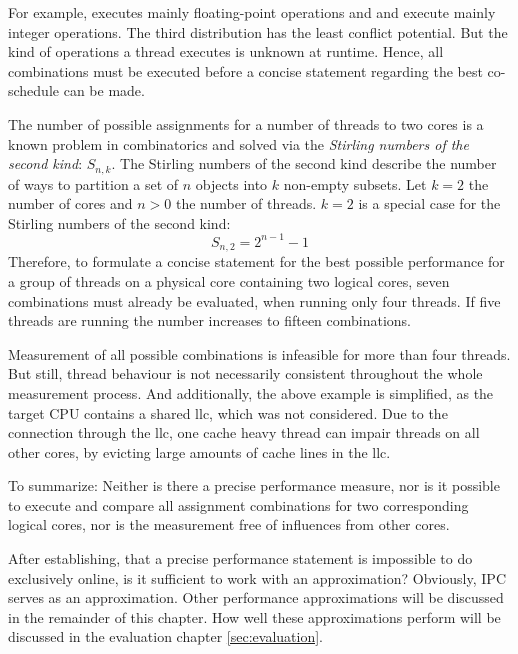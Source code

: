 For example, \gamma{} executes mainly floating-point operations and
\alpha{} and \beta{} execute mainly integer operations.
The third distribution has the least conflict potential.
But the kind of operations a thread executes is unknown at runtime.
Hence, all combinations must be executed before a concise statement regarding
the best co-schedule can be made.

The number of possible assignments for a number of threads to two cores is
a known problem in combinatorics and solved via the
\emph{Stirling numbers of the second kind}: $S_{n,k}$.
The Stirling numbers of the second kind describe the number of ways to
partition a set of $n$ objects into $k$ non-empty subsets.
Let $k=2$ the number of cores and $n>0$ the number of threads.
$k=2$ is a special case for the Stirling numbers of the second kind:
%
$$S_{n,2} = 2^{n-1}-1$$
%
Therefore, to formulate a concise statement for the best possible performance
for a group of threads on a physical core containing two logical cores,
seven combinations must already be evaluated, when running only four threads.
If five threads are running the number increases to fifteen combinations.

Measurement of all possible combinations is infeasible for more than four
threads.
But still, thread behaviour is not necessarily consistent throughout the whole
measurement process.
And additionally, the above example is simplified, as the target CPU contains a
shared \gls{llc}, which was not considered.
Due to the connection through the \gls{llc}, one cache heavy thread can impair
threads on all other cores, by evicting large amounts of cache lines in the
\gls{llc}.

To summarize: Neither is there a precise performance measure,
nor is it possible to execute and compare all assignment combinations for two
corresponding logical cores,
nor is the measurement free of influences from other cores.

After establishing, that a precise performance statement is impossible to do
exclusively online, is it sufficient to work with an approximation?
Obviously, IPC serves as an approximation.
Other performance approximations will be discussed in the remainder of this
chapter.
How well these approximations perform will be discussed in the evaluation
chapter \ref{sec:evaluation}.
\\

